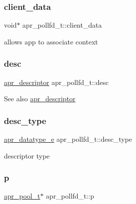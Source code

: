 \subsubsection{\texorpdfstring{client\+\_\+data}{client\_data}}
{\footnotesize\ttfamily void$\ast$ apr\+\_\+pollfd\+\_\+t\+::client\+\_\+data}

allows app to associate context \mbox{\label{structapr__pollfd__t_ad63baa71bb91f80513d33482e28fb967}} 
\subsubsection{\texorpdfstring{desc}{desc}}
{\footnotesize\ttfamily \mbox{\hyperlink{unionapr__descriptor}{apr\+\_\+descriptor}} apr\+\_\+pollfd\+\_\+t\+::desc}

\begin{DoxySeeAlso}{See also}
\mbox{\hyperlink{unionapr__descriptor}{apr\+\_\+descriptor}} 
\end{DoxySeeAlso}
\mbox{\label{structapr__pollfd__t_acfafd260241a874745f49ba2df246c53}} 
\subsubsection{\texorpdfstring{desc\+\_\+type}{desc\_type}}
{\footnotesize\ttfamily \mbox{\hyperlink{group__apr__poll_ga0a8549d84c1721788b102a4cc8b4b0f0}{apr\+\_\+datatype\+\_\+e}} apr\+\_\+pollfd\+\_\+t\+::desc\+\_\+type}

descriptor type \mbox{\label{structapr__pollfd__t_adae68586ed671472590efe8770de38cc}} 
\subsubsection{\texorpdfstring{p}{p}}
{\footnotesize\ttfamily \mbox{\hyperlink{group__apr__pools_gaf137f28edcf9a086cd6bc36c20d7cdfb}{apr\+\_\+pool\+\_\+t}}$\ast$ apr\+\_\+pollfd\+\_\+t\+::p}

